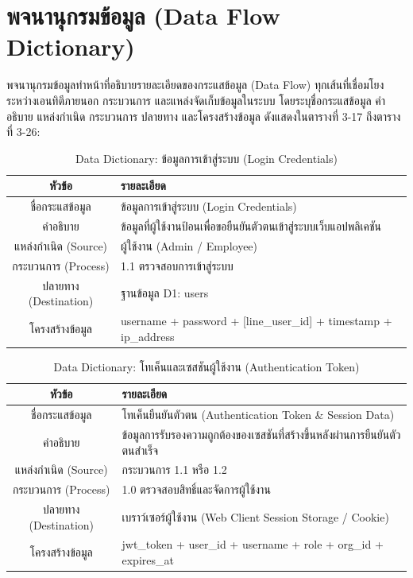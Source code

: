 \section{พจนานุกรมข้อมูล (Data Flow Dictionary)}
\hspace*{1.3em}
พจนานุกรมข้อมูลทำหน้าที่อธิบายรายละเอียดของกระแสข้อมูล (Data Flow) ทุกเส้นที่เชื่อมโยงระหว่างเอนทิตีภายนอก กระบวนการ และแหล่งจัดเก็บข้อมูลในระบบ โดยระบุชื่อกระแสข้อมูล คำอธิบาย แหล่งกำเนิด กระบวนการ ปลายทาง และโครงสร้างข้อมูล ดังแสดงในตารางที่ 3-17 ถึงตารางที่ 3-26:

\begin{table}[htbp]
\centering
\caption{Data Dictionary: ข้อมูลการเข้าสู่ระบบ (Login Credentials)}
\label{tab3:df_login}
\begin{tabularx}{\textwidth}{| c | L |}
\hline
\textbf{หัวข้อ} & \textbf{รายละเอียด} \\ \hline
ชื่อกระแสข้อมูล & ข้อมูลการเข้าสู่ระบบ (Login Credentials) \\ \hline
คำอธิบาย & ข้อมูลที่ผู้ใช้งานป้อนเพื่อขอยืนยันตัวตนเข้าสู่ระบบเว็บแอปพลิเคชัน \\ \hline
แหล่งกำเนิด (Source) & ผู้ใช้งาน (Admin / Employee) \\ \hline
กระบวนการ (Process) & 1.1 ตรวจสอบการเข้าสู่ระบบ \\ \hline
ปลายทาง (Destination) & ฐานข้อมูล D1: users \\ \hline
โครงสร้างข้อมูล & username + password + [line\_user\_id] + timestamp + ip\_address \\ \hline
\end{tabularx}
\end{table}

\begin{table}[htbp]
\centering
\caption{Data Dictionary: โทเค็นและเซสชันผู้ใช้งาน (Authentication Token)}
\label{tab3:df_token}
\begin{tabularx}{\textwidth}{| c | L |}
\hline
\textbf{หัวข้อ} & \textbf{รายละเอียด} \\ \hline
ชื่อกระแสข้อมูล & โทเค็นยืนยันตัวตน (Authentication Token \& Session Data) \\ \hline
คำอธิบาย & ข้อมูลการรับรองความถูกต้องของเซสชันที่สร้างขึ้นหลังผ่านการยืนยันตัวตนสำเร็จ \\ \hline
แหล่งกำเนิด (Source) & กระบวนการ 1.1 หรือ 1.2 \\ \hline
กระบวนการ (Process) & 1.0 ตรวจสอบสิทธิ์และจัดการผู้ใช้งาน \\ \hline
ปลายทาง (Destination) & เบราว์เซอร์ผู้ใช้งาน (Web Client Session Storage / Cookie) \\ \hline
โครงสร้างข้อมูล & jwt\_token + user\_id + username + role + org\_id + expires\_at \\ \hline
\end{tabularx}
\end{table}

